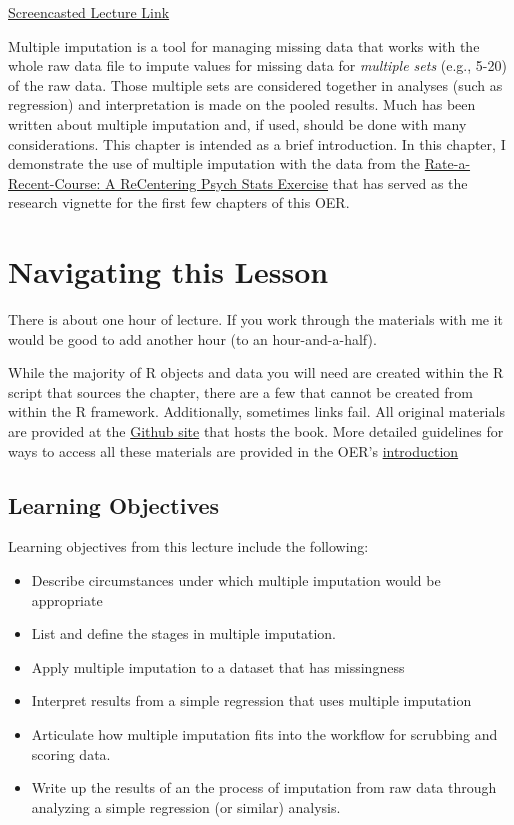 \documentclass[
  11pt,
]{book}
\providecommand{\tightlist}{%
  \setlength{\itemsep}{0pt}\setlength{\parskip}{0pt}}
\begin{document}
\href{https://spu.hosted.panopto.com/Panopto/Pages/Viewer.aspx?pid=94d59efe-3f02-4c65-b068-ad01003e09a9}{Screencasted Lecture Link}

Multiple imputation is a tool for managing missing data that works with the whole raw data file to impute values for missing data for \emph{multiple sets} (e.g., 5-20) of the raw data. Those multiple sets are considered together in analyses (such as regression) and interpretation is made on the pooled results. Much has been written about multiple imputation and, if used, should be done with many considerations. This chapter is intended as a brief introduction. In this chapter, I demonstrate the use of multiple imputation with the data from the \href{https://spupsych.az1.qualtrics.com/jfe/form/SV_b2cClqAlLGQ6nLU}{Rate-a-Recent-Course: A ReCentering Psych Stats Exercise} that has served as the research vignette for the first few chapters of this OER.

\hypertarget{navigating-this-lesson-3}{%
\section{Navigating this Lesson}\label{navigating-this-lesson-3}}

There is about one hour of lecture. If you work through the materials with me it would be good to add another hour (to an hour-and-a-half).

While the majority of R objects and data you will need are created within the R script that sources the chapter, there are a few that cannot be created from within the R framework. Additionally, sometimes links fail. All original materials are provided at the \href{https://github.com/lhbikos/ReC_MultivModel}{Github site} that hosts the book. More detailed guidelines for ways to access all these materials are provided in the OER's \protect\hyperlink{ReCintro}{introduction}

\hypertarget{learning-objectives-3}{%
\subsection{Learning Objectives}\label{learning-objectives-3}}

Learning objectives from this lecture include the following:

\begin{itemize}
\tightlist
\item
  Describe circumstances under which multiple imputation would be appropriate
\item
  List and define the stages in multiple imputation.
\item
  Apply multiple imputation to a dataset that has missingness
\item
  Interpret results from a simple regression that uses multiple imputation
\item
  Articulate how multiple imputation fits into the workflow for scrubbing and scoring data.
\item
  Write up the results of an the process of imputation from raw data through analyzing a simple regression (or similar) analysis.
\end{itemize}
\end{document}
